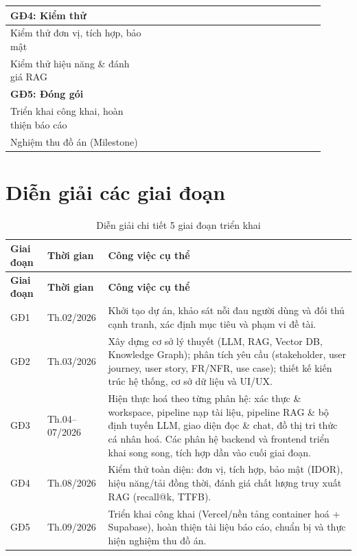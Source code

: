 \begin{landscape}
\begin{table}[p]
\begin{tabular}{|L{0.40\linewidth}|*{8}{C{0.064\linewidth}|}}
    \textbf{GĐ4: Kiểm thử} & & & & & & & & \\ \hline
    Kiểm thử đơn vị, tích hợp, bảo mật & & & & & & &  & \\ \hline
    Kiểm thử hiệu năng \& đánh giá RAG & & & & & & &  & \\ \hline
    
    \textbf{GĐ5: Đóng gói} & & & & & & & & \\ \hline
    Triển khai công khai, hoàn thiện báo cáo & & & & & & & &  \\ \hline
    Nghiệm thu đồ án (Milestone) & & & & & & & &  \\ \hline
    \end{tabular}
\end{table}
\end{landscape}

\section{Diễn giải các giai đoạn}
\begin{longtable}{|C{0.12\textwidth}|C{0.15\textwidth}|L{0.63\textwidth}|}
\caption{Diễn giải chi tiết 5 giai đoạn triển khai}\\
\hline
\textbf{Giai đoạn} & \textbf{Thời gian} & \textbf{Công việc cụ thể} \\\hline
\endfirsthead
\hline
\textbf{Giai đoạn} & \textbf{Thời gian} & \textbf{Công việc cụ thể} \\\hline
\endhead
GĐ1 & Th.02/2026 & Khởi tạo dự án, khảo sát nỗi đau người dùng và đối thủ cạnh tranh, xác định mục tiêu và phạm vi đề tài. \\\hline
GĐ2 & Th.03/2026 & Xây dựng cơ sở lý thuyết (LLM, RAG, Vector DB, Knowledge Graph); phân tích yêu cầu (stakeholder, user journey, user story, FR/NFR, use case); thiết kế kiến trúc hệ thống, cơ sở dữ liệu và UI/UX. \\\hline
GĐ3 & Th.04--07/2026 & Hiện thực hoá theo từng phân hệ: xác thực \& workspace, pipeline nạp tài liệu, pipeline RAG \& bộ định tuyến LLM, giao diện đọc \& chat, đồ thị tri thức cá nhân hoá. Các phân hệ backend và frontend triển khai song song, tích hợp dần vào cuối giai đoạn. \\\hline
GĐ4 & Th.08/2026 & Kiểm thử toàn diện: đơn vị, tích hợp, bảo mật (IDOR), hiệu năng/tải đồng thời, đánh giá chất lượng truy xuất RAG (recall@k, TTFB). \\\hline
GĐ5 & Th.09/2026 & Triển khai công khai (Vercel/nền tảng container hoá + Supabase), hoàn thiện tài liệu báo cáo, chuẩn bị và thực hiện nghiệm thu đồ án. \\\hline
\end{longtable}
